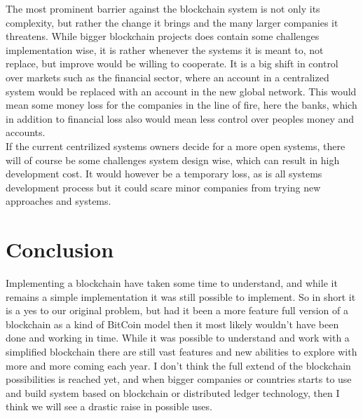 \documentclass[paper=a4, fontsize=11pt]{scrartcl} %
\numberwithin{equation}{section} %
\numberwithin{figure}{section} %
\numberwithin{table}{section} %
\begin{document}
The most prominent barrier against the blockchain system is not only its complexity, but rather the change it brings and the many larger companies it threatens. While bigger blockchain projects does contain some challenges implementation wise, it is rather whenever the systems it is meant to, not replace, but improve would be willing to cooperate. It is a big shift in control over markets such as the financial sector, where an account in a centralized system would be replaced with an account in the new global network. This would mean some money loss for the companies in the line of fire, here the banks, which in addition to financial loss also would mean less control over peoples money and accounts.\\

If the current centrilized systems owners decide for a more open systems, there will of course be some challenges system design wise, which can result in high development cost. It would however be a temporary loss, as is all systems development process but it could scare minor companies from trying new approaches and systems.

\section{Conclusion}

Implementing a blockchain have taken some time to understand, and while it remains a simple implementation it was still possible to implement. So in short it is a yes to our original problem, but had it been a more feature full version of a blockchain as a kind of BitCoin model then it most likely wouldn't have been done and working in time. While it was possible to understand and work with a simplified blockchain there are still vast features and new abilities to explore with more and more coming each year. I don't think the full extend of the blockchain possibilities is reached yet, and when bigger companies or countries starts to use and build system based on blockchain or distributed ledger technology, then I think we will see a drastic raise in possible uses.  

\newpage
\end{document}
